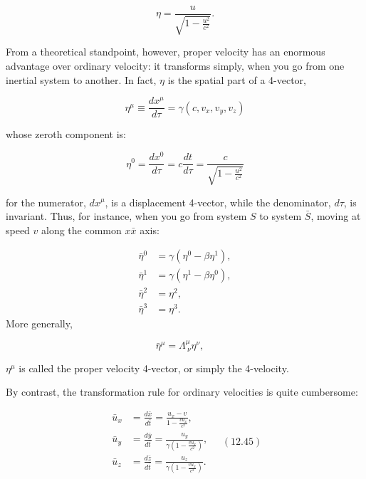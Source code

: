 \documentclass[12pt]{book}
\begin{document}
        \[
        \eta = \frac{u}{\sqrt{1 - \frac{u^2}{c^2}}}.
        \]
        
        From a theoretical standpoint, however, proper velocity has an enormous advantage over ordinary velocity: it transforms simply, when you go from one inertial system to another. In fact, \(\eta\) is the spatial part of a 4-vector,
        
        \[
        \eta^\mu \equiv \frac{dx^\mu}{d\tau}=\gamma(c, v_x, v_y, v_z)
        \]
        
        whose zeroth component is:
        
        \[
        \eta^0 = \frac{dx^0}{d\tau} = c \frac{dt}{d\tau} = \frac{c}{\sqrt{1 - \frac{u^2}{c^2}}}
        \]
        
        for the numerator, \(dx^\mu\), is a displacement 4-vector, while the denominator, \(d\tau\), is invariant. Thus, for instance, when you go from system \(S\) to system \(\bar{S}\), moving at speed \(v\) along the common \(x\)\(\bar{x}\) axis:
        
        \[
        \begin{aligned}
        \bar{\eta}^0 &= \gamma (\eta^0 - \beta \eta^1), \\
        \bar{\eta}^1 &= \gamma (\eta^1 - \beta \eta^0), \\
        \bar{\eta}^2 &= \eta^2, \\
        \bar{\eta}^3 &= \eta^3.
        \end{aligned}
        \]
        More generally,
        
        \[
        \bar{\eta}^\mu = \Lambda^\mu_{\ \nu} \eta^\nu, \quad
        \]
        
        \(\eta^\mu\) is called the proper velocity 4-vector, or simply the 4-velocity.
        
        By contrast, the transformation rule for ordinary velocities is quite cumbersome:
        
        \[
        \begin{aligned}
        \bar{u}_x &= \frac{d\bar{x}}{d\bar{t}} = \frac{u_x - v}{1 - \frac{vu_x}{c^2}}, \\
        \bar{u}_y &= \frac{d\bar{y}}{d\bar{t}} = \frac{u_y}{\gamma \left(1 - \frac{vu_x}{c^2}\right)}, \\
        \bar{u}_z &= \frac{d\bar{z}}{d\bar{t}} = \frac{u_z}{\gamma \left(1 - \frac{vu_x}{c^2}\right)}.
        \end{aligned} \quad (12.45)
        \]
        
\end{document}
